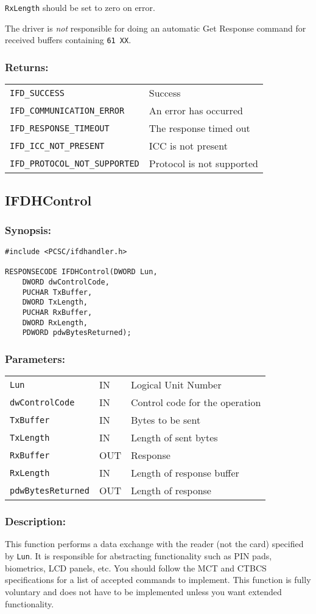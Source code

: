 \documentclass[a4paper,12pt]{article}
\newcommand{\synopsis}{\subsubsection{Synopsis:}}
\newcommand{\parameters}{\subsubsection{Parameters:}}
\newcommand{\desc}{\subsubsection{Description:}}
\newcommand{\returns}{\subsubsection{Returns:}}
\begin{document}
\texttt{RxLength} should be set to zero on error.

The driver is \emph{not} responsible for doing an automatic Get Response
command for received buffers containing \texttt{61 XX}.

\returns

\begin{tabular}{ll}
\texttt{IFD\_SUCCESS} & Success\\
\texttt{IFD\_COMMUNICATION\_ERROR} & An error has occurred\\
\texttt{IFD\_RESPONSE\_TIMEOUT} & The response timed out\\
\texttt{IFD\_ICC\_NOT\_PRESENT} & ICC is not present\\
\texttt{IFD\_PROTOCOL\_NOT\_SUPPORTED} & Protocol is not supported
\end{tabular}


\subsection{IFDHControl}
\label{IFDHControl}

\synopsis
\begin{verbatim}
#include <PCSC/ifdhandler.h>

RESPONSECODE IFDHControl(DWORD Lun,
    DWORD dwControlCode,
    PUCHAR TxBuffer,
    DWORD TxLength,
    PUCHAR RxBuffer,
    DWORD RxLength,
    PDWORD pdwBytesReturned);
\end{verbatim}

\parameters

\begin{tabular}{lll}
\texttt{Lun} & IN & Logical Unit Number\\
\texttt{dwControlCode} & IN & Control code for the operation\\
\texttt{TxBuffer} & IN & Bytes to be sent\\
\texttt{TxLength} & IN & Length of sent bytes\\
\texttt{RxBuffer} & OUT & Response\\
\texttt{RxLength} & IN & Length of response buffer\\
\texttt{pdwBytesReturned} & OUT & Length of response \\
\end{tabular}

\desc

This function performs a data exchange with the reader (not the card)
specified by \texttt{Lun}. It is responsible for abstracting
functionality such as PIN pads, biometrics, LCD panels, etc.  You should
follow the MCT and CTBCS specifications for a list of accepted commands
to implement. This function is fully voluntary and does not have to be
implemented unless you want extended functionality.
\end{document}
